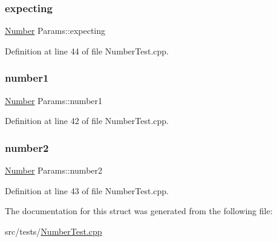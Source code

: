 \subsubsection{\texorpdfstring{expecting}{expecting}}
{\footnotesize\ttfamily \hyperlink{classteam22_1_1_math_1_1_number}{Number} Params\+::expecting}



Definition at line 44 of file Number\+Test.\+cpp.

\mbox{\label{struct_params_abfbdd38f4448b9722ca7faeffdf4ef36}} 
\subsubsection{\texorpdfstring{number1}{number1}}
{\footnotesize\ttfamily \hyperlink{classteam22_1_1_math_1_1_number}{Number} Params\+::number1}



Definition at line 42 of file Number\+Test.\+cpp.

\mbox{\label{struct_params_af25f02c145e03d78112c0a3e7258155f}} 
\subsubsection{\texorpdfstring{number2}{number2}}
{\footnotesize\ttfamily \hyperlink{classteam22_1_1_math_1_1_number}{Number} Params\+::number2}



Definition at line 43 of file Number\+Test.\+cpp.



The documentation for this struct was generated from the following file\+:\begin{DoxyCompactItemize}
\item 
src/tests/\hyperlink{_number_test_8cpp}{Number\+Test.\+cpp}\end{DoxyCompactItemize}
